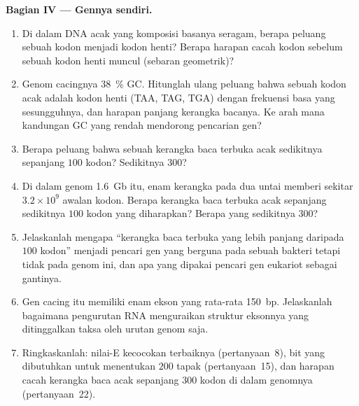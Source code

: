\begin{problem}
\medskip
\noindent\textbf{Bagian IV --- Gennya sendiri.}
\begin{enumerate}[resume]
  \item Di dalam DNA acak yang komposisi basanya seragam, berapa
        peluang sebuah kodon menjadi kodon henti? Berapa harapan
        cacah kodon sebelum sebuah kodon henti muncul (sebaran
        geometrik)?
  \item Genom cacingnya \qty{38}{\%} GC. Hitunglah ulang peluang
        bahwa sebuah kodon acak adalah kodon henti (TAA, TAG, TGA) dengan
        frekuensi basa yang sesungguhnya, dan harapan panjang kerangka
        bacanya. Ke arah mana kandungan GC yang rendah mendorong pencarian gen?
  \item Berapa peluang bahwa sebuah kerangka baca terbuka acak sedikitnya
        sepanjang $100$ kodon? Sedikitnya $300$?
  \item Di dalam genom \qty{1.6}{Gb} itu, enam kerangka pada dua untai
        memberi sekitar $3.2\times 10^{9}$ awalan kodon. Berapa kerangka baca
        terbuka acak sepanjang sedikitnya $100$ kodon yang diharapkan? Berapa
        yang sedikitnya $300$?
  \item Jelaskanlah mengapa ``kerangka baca terbuka yang lebih panjang
        daripada $100$ kodon'' menjadi pencari gen yang berguna pada sebuah
        bakteri tetapi tidak pada genom ini, dan apa yang dipakai pencari gen
        eukariot sebagai gantinya.
  \item Gen cacing itu memiliki enam ekson yang rata-rata \qty{150}{bp}.
        Jelaskanlah bagaimana  pengurutan RNA menguraikan struktur
        eksonnya yang ditinggalkan taksa oleh urutan genom saja.
  \item Ringkaskanlah: nilai-E kecocokan terbaiknya (pertanyaan~8), bit
        yang dibutuhkan untuk menentukan $200$ tapak (pertanyaan~15), dan
        harapan cacah kerangka baca acak sepanjang $300$ kodon di dalam
        genomnya (pertanyaan~22).
\end{enumerate}
\end{problem}

